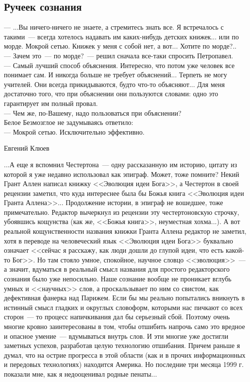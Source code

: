 \documentclass{scrbook}
\makeatletter
\newcommand{\bigepigraphwidth}{0.8} %
\newcommand{\defaultepigraphwidth}{0.5} %
\newcommand{\flqq}{<<}
\newcommand{\frqq}{>>}
\newcommand{\mdash}{~--- }
\newcommand{\sdash}{--- } %
\newcommand{\essaysection}[1]{\subsection*{#1}\nopagebreak}
\newcommand{\myepigraph}[3][\@empty]{
	\ifx\@empty#1
		\setlength{\epigraphwidth}{\defaultepigraphwidth\textwidth}
	\else
		\setlength{\epigraphwidth}{#1\textwidth}
	\fi
	\epigraph{#2}{#3}
	\setlength{\epigraphwidth}{\defaultepigraphwidth\textwidth} %
	\nopagebreak
}
\makeatother
\begin{document}
\essaysection{Ручеек сознания}

\myepigraph[\bigepigraphwidth]{{\sdash} ...Вы ничего-ничего не знаете, а стремитесь знать все. Я встречалось с такими{\mdash}всегда хотелось надавать им каких-нибудь детских книжек... или по морде. Мокрой сетью. Книжек у меня с собой нет, а вот... Хотите по морде?.. \\
{\sdash} Зачем это{\mdash}по морде?{\mdash}решил сначала все-таки спросить Петропавел. \\
{\sdash} Самый лучший способ объяснения. Интересно, что потом уже человек все понимает сам. И никогда больше не требует объяснений... Терпеть не могу учителей. Они всегда прикидываются, будто что-то объясняют... Для меня достаточно того, что при объяснении они пользуются словами: одно это гарантирует им полный провал. \\
{\sdash} Чем же, по-Вашему, надо пользоваться при объяснении? \\
Белое Безмозглое не задумываясь ответило: \\
{\sdash} Мокрой сетью. Исключительно эффективно.}
{Евгений Клюев}

...А еще я вспомнил Честертона{\mdash}одну рассказанную им историю, цитату из которой я уже недавно использовал как эпиграф. Может, тоже помните? Некий Грант Аллен написал книжку {\flqq}Эволюция идеи Бога{\frqq}, а Честертон в своей рецензии заметил, что куда интереснее была бы Божья книга {\flqq}Эволюция идеи Гранта Аллена{\frqq}... Продолжение истории, в эпиграф не вошедшее, тоже примечательно. Редактор вычеркнул из рецензии эту честертоновскую строчку, убоявшись кощунства (как же, {\flqq}Божья книга{\frqq}, неуместная хохма...). А вот реальной кощунственности названия книжки Гранта Аллена редактор не заметил, хотя в переводе на человеческий язык {\flqq}Эволюция идеи Бога{\frqq} буквально означает {\flqq}сейчас я расскажу, как люди дошли до глупой идеи, что есть какой-то Бог{\frqq}. Но там стояло умное, спокойное, научное словцо {\flqq}эволюция{\frqq}{\mdash}а значит, вдуматься в реальный смысл названия для простого редакторского сознания было уже непосильно. Наше сознание вообще не проникает вглубь умных и {\flqq}научных{\frqq} слов, а проскальзывает по ним со свистом, как дефективная фанерка над Парижем. Если бы мы реально попытались вникнуть в истинный смысл гладких и округлых словоформ, которыми нас пичкают со всех сторон{\mdash}то процесс напичкивания дал бы серьезный сбой. Поэтому очень многие кровно заинтересованы в том, чтобы отшибить напрочь само это вредное и опасное умение{\mdash}вдумываться внутрь слов. И эти многие уже достигли заметных успехов, разработав целую технологию отшибания. Причем раньше я думал, что на острие прогресса в этой области (как и в прочих информационных и передовых технологиях) находится Америка. Но последние три месяца 1999 г. показали мне, как я недооценивал родные пенаты...
\end{document}
